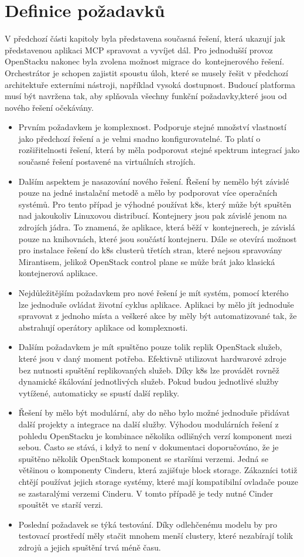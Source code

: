 \section{Definice požadavků}
V předchozí části kapitoly byla představena současná řešení, která ukazují jak představenou aplikaci MCP spravovat a vyvíjet dál. Pro jednodušší provoz OpenStacku nakonec byla zvolena možnost migrace do kontejnerového řešení. Orchestrátor je schopen zajistit spoustu úloh, které se musely řešit v předchozí architektuře externími nástroji, například vysoká dostupnost. Budoucí platforma musí být navržena tak, aby splňovala všechny funkční požadavky,které jsou od nového řešení očekávány.
\begin{itemize}
\item Prvním požadavkem je komplexnost. Podporuje stejné množství vlastností jako předchozí řešení a je velmi snadno konfigurovatelné. To platí o rozšiřitelnosti řešení, která by měla podporovat stejné spektrum integrací jako současné řešení postavené na virtuálních strojích.
\item Dalším aspektem je nasazování nového řešení. Řešení by nemělo být závislé pouze na jedné instalační metodě a mělo by podporovat více operačních systémů. Pro tento případ je výhodné používat k8s, který může být spuštěn nad jakoukoliv Linuxovou distribucí. Kontejnery jsou pak závislé jenom na zdrojích jádra. To znamená, že aplikace, která běží v kontejnerech, je závislá pouze na knihovnách, které jsou součástí kontejneru. Dále se otevírá možnost pro instalace řešení do k8s clusterů třetích stran, které nejsou spravovány Mirantisem, jelikož OpenStack control plane se může brát jako klasická kontejnerová aplikace.
\item Nejdůležitějším požadavkem pro nové řešení je mít systém, pomocí kterého lze jednoduše ovládat životní cyklus aplikace. Aplikaci by mělo jít jednoduše spravovat z jednoho místa a veškeré akce by měly být automatizované tak, že abstrahují operátory aplikace od komplexnosti.
\item Dalším požadavkem je mít spuštěno pouze tolik replik OpenStack služeb, které jsou v daný moment potřeba. Efektivně utilizovat hardwarové zdroje bez nutnosti spuštění replikovaných služeb. Díky k8s lze provádět rovněž dynamické škálování jednotlivých služeb. Pokud budou jednotlivé služby vytížené, automaticky se spustí další repliky.
\item Řešení by mělo být modulární, aby do něho bylo možné jednoduše přidávat další projekty a integrace na další služby. Výhodou modulárních řešení z pohledu OpenStacku je kombinace několika odlišných verzí komponent mezi sebou. Často se stává, i když to není v dokumentaci doporučováno, že je spuštěno několik OpenStack komponent se staršími verzemi. Jedná se většinou o komponenty Cinderu, která zajišťuje block storage. Zákazníci totiž chtějí používat jejich storage systémy, které mají kompatibilní ovladače pouze se zastaralými verzemi Cinderu. V tomto případě je tedy nutné Cinder spouštět ve starší verzi.
\item Poslední požadavek se týká testování. Díky odlehčenému modelu by pro testovací prostředí měly stačit mnohem menší clustery, které nezabírají tolik zdrojů a jejich spuštění trvá méně času.
\end{itemize}

